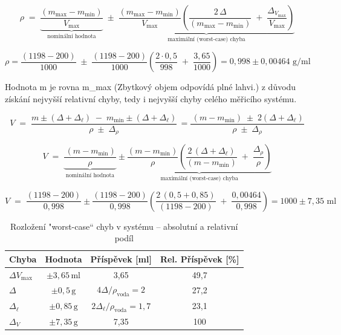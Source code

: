\begin{equation}
\rho \;=\;
\underbrace{
\frac{(m_{\max}-m_{\min})}{V_{\max}}
}_{\text{nominální hodnota}}
\;\pm\;
\underbrace{
\frac{(m_{\max}-m_{\min})}{V_{\max}}
\left(
   \frac{2\,\Delta}{(m_{\max}-m_{\min})} \;+\; \frac{\Delta_{V_{\max}}}{V_{\max}}
\right)
}_{\text{maximální (worst-case) chyba}}
     \label{objem_kapalinaaa}
\end{equation}

\begin{equation}
\rho = \frac{(1198-200)}{1000}
\;\pm\;
\frac{(1198-200)}{1000}
\left(
   \frac{2 \cdot 0,5}{998} \;+\; \frac{3,65}{1000}
\right) = 0,998 \pm 0,00464 \text{ g/ml}
     \label{objem_kapalinaa}
\end{equation}

\bigskip
Hodnota m je rovna m\_max (Zbytkový objem odpovídá plné lahvi.) z důvodu získání nejvyšší relativní chyby, tedy i nejvyšší chyby celého měřicího systému.

\begin{equation}
V \;=\;
\frac{m \pm (\Delta + \Delta_\ell) \;-\; m_{\min} \pm (\Delta + \Delta_\ell)}
     {\rho \;\pm\; \Delta_\rho}\, = 
\frac{\,(m-m_{\min}) \;\pm\; 2(\Delta + \Delta_\ell)}
     {\rho \;\pm\; \Delta_\rho}
 \end{equation}

 \begin{equation}
V \;=\;
\underbrace{
\frac{\,(m-m_{\min})}
     {\rho} 
 }_{\text{nominální hodnota}}
 \pm
 \underbrace{
 \frac{(m-m_{\min})}{\rho}
\left(
   \frac{2\,(\Delta+\Delta_\ell)}{(m-m_{\min})} \;+\; \frac{\Delta_\rho}{\rho}
\right)
}_{\text{maximální (worst-case) chyba}}
 \end{equation}

 \begin{equation}
V \;=\;
\frac{(1198-200)}{0,998}
\pm
 \frac{(1198-200)}{0,998}
\left(
   \frac{2\,(0,5+0,85)}{(1198-200)} \;+\; \frac{0,00464}{0,998}
\right) = 1000 \pm 7,35 \text{ ml}
\label{vypočet_objemu}
 \end{equation}

\begin{table}[h]
    \centering
    \begin{tabular}{|l|c|c|c|}
        \hline
        \textbf{Chyba} & \textbf{Hodnota} & \textbf{Příspěvek [ml]} & \textbf{Rel. Příspěvek [\%]} \\
        \hline \hline
        $\Delta V_{\text{max}}$ & $\pm 3{,}65 \, \text{ml}$ & 3{,}65 & 49,7 \\
        \hline
        $\Delta$ & $\pm 0{,}5 \, \text{g}$ & $4\Delta / \rho_{\text{voda}} = 2$ & 27,2 \\
        \hline
        $\Delta_\ell$ & $\pm 0{,}85 \, \text{g}$ & $2\Delta_\ell / \rho_{\text{voda}} = 1{,}7$ & 23,1 \\
        \hline
        $\Delta_V$ & $\pm 7{,}35 \, \text{g}$ & 7,35 & 100 \\
        \hline
    \end{tabular}
    \caption{Rozložení "worst-case“ chyb v systému – absolutní a relativní podíl}
    \label{tab:chyby_rozloení}
\end{table}

